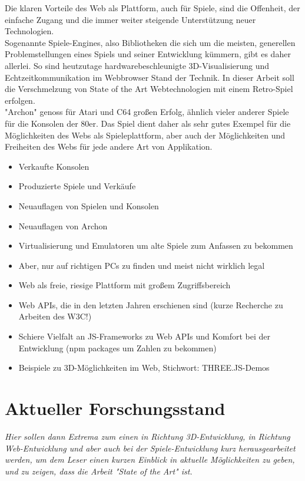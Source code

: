 Die klaren Vorteile des Web als Plattform, auch für Spiele, sind die Offenheit, der einfache Zugang und die immer weiter steigende Unterstützung neuer Technologien.\\
Sogenannte Spiele-Engines, also Bibliotheken die sich um die meisten, generellen Problemstellungen eines Spiels und seiner Entwicklung kümmern, gibt es daher allerlei.
So sind heutzutage hardwarebeschleunigte 3D-Visualisierung und Echtzeitkommunikation im Webbrowser Stand der Technik.
In dieser Arbeit soll die Verschmelzung von State of the Art Webtechnologien mit einem Retro-Spiel erfolgen.\\
"Archon" genoss für Atari und C64 großen Erfolg, ähnlich vieler anderer Spiele für die Konsolen der 80er.
Das Spiel dient daher als sehr gutes Exempel für die Möglichkeiten des Webs als Spieleplattform, aber auch der Möglichkeiten und Freiheiten des Webs für jede andere Art von Applikation.
\begin{itemize}
	\item Verkaufte Konsolen
	\item Produzierte Spiele und Verkäufe
	\item Neuauflagen von Spielen und Konsolen
	\item Neuauflagen von Archon 
	\item Virtualisierung und Emulatoren um alte Spiele zum Anfassen zu bekommen
	\item Aber, nur auf richtigen PCs zu finden und meist nicht wirklich legal
	\item Web als freie, riesige Plattform mit großem Zugriffsbereich
	\item Web APIs, die in den letzten Jahren erschienen sind (kurze Recherche zu Arbeiten des W3C!)
	\item Schiere Vielfalt an JS-Frameworks zu Web APIs und Komfort bei der Entwicklung (npm packages um Zahlen zu bekommen)
	\item Beispiele zu 3D-Möglichkeiten im Web, Stichwort: THREE.JS-Demos
\end{itemize}

\section{Aktueller Forschungsstand}
\label{sec:aktueller_forschungsstand}

\emph{Hier sollen dann Extrema zum einen in Richtung 3D-Entwicklung, in Richtung Web-Entwicklung und aber auch bei der Spiele-Entwicklung kurz herausgearbeitet werden, um dem Leser einen kurzen Einblick in aktuelle Möglichkeiten zu geben, und zu zeigen, dass die Arbeit "State of the Art" ist.}

